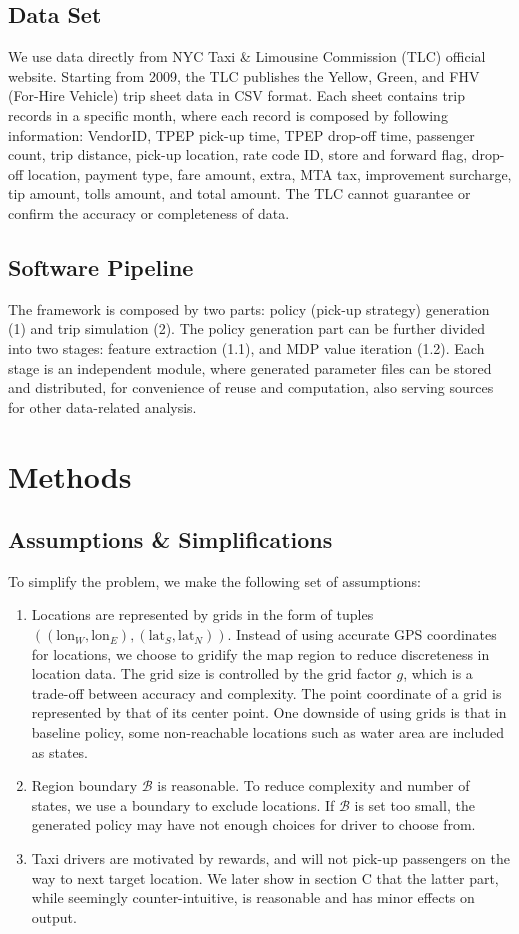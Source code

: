 \documentclass[letterpaper, 10 pt, conference]{ieeeconf}
\begin{document}
\subsection{Data Set}
We use data directly from NYC Taxi \& Limousine Commission (TLC) official website\cite{}. Starting from 2009, the TLC publishes the Yellow, Green, and FHV (For-Hire Vehicle) trip sheet data in CSV format. Each sheet contains trip records in a specific month, where each record is composed by following information: VendorID, TPEP pick-up time, TPEP drop-off time, passenger count, trip distance, pick-up location, rate code ID, store and forward flag, drop-off location, payment type, fare amount, extra, MTA tax, improvement surcharge, tip amount, tolls amount, and total amount\cite{}. The TLC cannot guarantee or confirm the accuracy or completeness of data. 
\subsection{Software Pipeline}
The framework is composed by two parts: policy (pick-up strategy) generation (1) and trip simulation (2). The policy generation part can be further divided into two stages: feature extraction (1.1), and MDP value iteration (1.2). Each stage is an independent module, where generated parameter files can be stored and distributed, for convenience of reuse and computation, also serving sources for other data-related analysis. 
\section{Methods}
\subsection{Assumptions \& Simplifications}
To simplify the problem, we make the following set of assumptions:
\begin{enumerate}
\item Locations are represented by grids in the form of tuples $((\text{lon}_W, \text{lon}_E), (\text{lat}_S, \text{lat}_N))$. Instead of using accurate GPS coordinates for locations, we choose to gridify the map region to reduce discreteness in location data. The grid size is controlled by the grid factor $g$, which is a trade-off between accuracy and complexity. The point coordinate of a grid is represented by that of its center point. One downside of using grids is that in baseline policy, some non-reachable locations such as water area are included as states.
\item Region boundary $\mathcal{B}$ is reasonable. To reduce complexity and number of states, we use a boundary to exclude locations. If $\mathcal{B}$ is set too small, the generated policy may have not enough choices for driver to choose from.
\item Taxi drivers are motivated by rewards, and will not pick-up passengers on the way to next target location. We later show in section C that the latter part, while seemingly counter-intuitive, is reasonable and has minor effects on output.
\end{enumerate}
\end{document}
